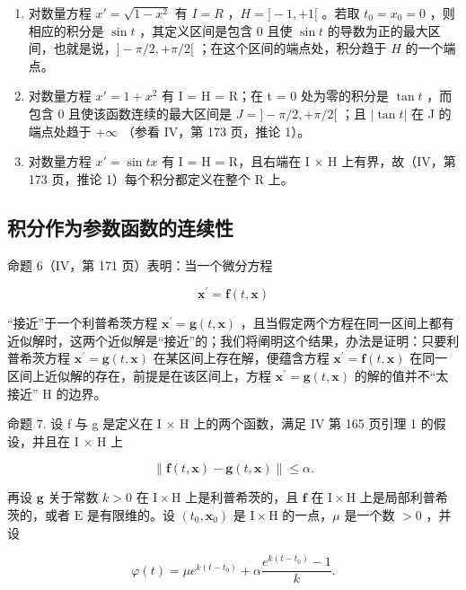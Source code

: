 \begin{enumerate}
\def\labelenumi{\arabic{enumi})}
\setcounter{enumi}{1}
\item
  对数量方程 \(x' = \sqrt{1 - x^2}\) 有 \(I = R\) ，\(H = ] - 1, +1[\) 。若取 \(t_0 = x_0 = 0\) ，则相应的积分是 \(\sin t\) ，其定义区间是包含 0 且使 \(\sin t\) 的导数为正的最大区间，也就是说，\(] - \pi / 2, +\pi / 2[\) ；在这个区间的端点处，积分趋于 \(H\) 的一个端点。
\item
  对数量方程 \(x' = 1 + x^{2}\) 有 I = H = R；在 t = 0 处为零的积分是 \(\tan t\) ，而包含 0 且使该函数连续的最大区间是 \(J = ] - \pi/2, +\pi/2[\) ；且 \(|\tan t|\) 在 J 的端点处趋于 \(+\infty\) （参看 IV，第 173 页，推论 1）。
\item
  对数量方程 \(x' = \sin tx\) 有 I = H = R，且右端在 I × H 上有界，故（IV，第 173 页，推论 1）每个积分都定义在整个 R 上。
\end{enumerate}

\subsection{积分作为参数函数的连续性}

命题 6（IV，第 171 页）表明：当一个微分方程

\[
\mathbf {x} ^ {\prime} = \mathbf {f} (t, \mathbf {x})
\]

“接近”于一个利普希茨方程 \(\mathbf{x}^{\prime} = \mathbf{g}(t, \mathbf{x})\) ，且当假定两个方程在同一区间上都有近似解时，这两个近似解是“接近”的；我们将阐明这个结果，办法是证明：只要利普希茨方程 \(\mathbf{x}^{\prime} = \mathbf{g}(t, \mathbf{x})\) 在某区间上存在解，便蕴含方程 \(\mathbf{x}^{\prime} = \mathbf{f}(t, \mathbf{x})\) 在同一区间上近似解的存在，前提是在该区间上，方程 \(\mathbf{x}^{\prime} = \mathbf{g}(t, \mathbf{x})\) 的解的值并不“太接近” H 的边界。

命题 7. 设 f 与 g 是定义在 I × H 上的两个函数，满足 IV 第 165 页引理 1 的假设，并且在 I × H 上

\[
\left\| \mathbf {f} (t, \mathbf {x}) - \mathbf {g} (t, \mathbf {x}) \right\| \leqslant \alpha .\tag{16}
\]

再设 \(\mathbf{g}\) 关于常数 \(k > 0\) 在 \(\mathrm{I} \times \mathrm{H}\) 上是利普希茨的，且 \(\mathbf{f}\) 在 \(\mathrm{I} \times \mathrm{H}\) 上是局部利普希茨的，或者 \(\mathrm{E}\) 是有限维的。设 \((t_0, \mathbf{x}_0)\) 是 \(\mathrm{I} \times \mathrm{H}\) 的一点，\(\mu\) 是一个数 \(>0\) ，并设

\[
\varphi (t) = \mu e ^ {k (t - t _ {0})} + \alpha \frac {e ^ {k (t - t _ {0})} - 1}{k}.
\]

